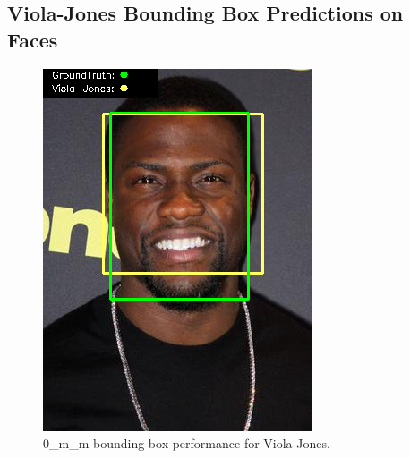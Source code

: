 \documentclass{l4proj}
\begin{document}
\begin{appendices}
\section{Viola-Jones Bounding Box Predictions on Faces}
\begin{figure}[h!]
  \centering
  \begin{minipage}{0.49\textwidth}
    \centering
     \includegraphics[width=\textwidth]{images/appendix/viola/0.png}
    \caption{0\_m\_m bounding box performance for Viola-Jones.}
    \label{whoopi_result}
  \end{minipage}
    \hfill
    \begin{minipage}{0.49\textwidth}
    \centering

\end{minipage}
\end{figure}
\end{appendices}
\end{document}
